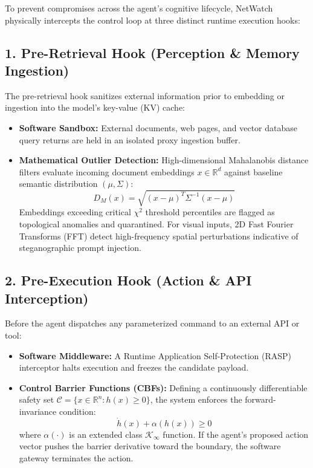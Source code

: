 To prevent compromises across the agent's cognitive lifecycle, NetWatch physically intercepts the control loop at three distinct runtime execution hooks:

\subsection{1. Pre-Retrieval Hook (Perception \& Memory Ingestion)}
The pre-retrieval hook sanitizes external information prior to embedding or ingestion into the model's key-value (KV) cache:
\begin{itemize}
    \item \textbf{Software Sandbox:} External documents, web pages, and vector database query returns are held in an isolated proxy ingestion buffer.
    \item \textbf{Mathematical Outlier Detection:} High-dimensional Mahalanobis distance filters evaluate incoming document embeddings $x \in \mathbb{R}^d$ against baseline semantic distribution $(\mu, \Sigma)$:
    \begin{equation}
        D_M(x) = \sqrt{(x - \mu)^T \Sigma^{-1} (x - \mu)}
    \end{equation}
    Embeddings exceeding critical $\chi^2$ threshold percentiles are flagged as topological anomalies and quarantined. For visual inputs, 2D Fast Fourier Transforms (FFT) detect high-frequency spatial perturbations indicative of steganographic prompt injection.
\end{itemize}

\subsection{2. Pre-Execution Hook (Action \& API Interception)}
Before the agent dispatches any parameterized command to an external API or tool:
\begin{itemize}
    \item \textbf{Software Middleware:} A Runtime Application Self-Protection (RASP) interceptor halts execution and freezes the candidate payload.
    \item \textbf{Control Barrier Functions (CBFs):} Defining a continuously differentiable safety set $\mathcal{C} = \{x \in \mathbb{R}^n : h(x) \ge 0\}$, the system enforces the forward-invariance condition:
    \begin{equation}
        \dot{h}(x) + \alpha(h(x)) \ge 0
    \end{equation}
    where $\alpha(\cdot)$ is an extended class $\mathcal{K}_\infty$ function. If the agent's proposed action vector pushes the barrier derivative toward the boundary, the software gateway terminates the action.
\end{itemize}

